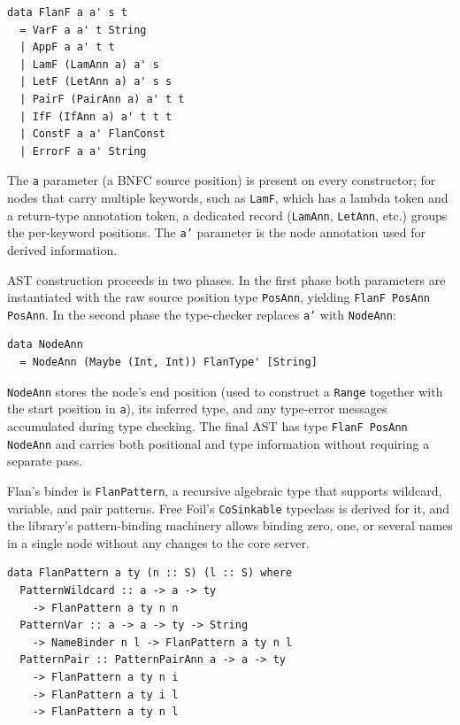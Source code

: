 \begin{verbatim}
data FlanF a a' s t
  = VarF a a' t String
  | AppF a a' t t
  | LamF (LamAnn a) a' s
  | LetF (LetAnn a) a' s s
  | PairF (PairAnn a) a' t t
  | IfF (IfAnn a) a' t t t
  | ConstF a a' FlanConst
  | ErrorF a a' String
\end{verbatim}

The \texttt{a} parameter (a BNFC source position) is present on every constructor; for nodes that carry multiple keywords, such as \texttt{LamF}, which has a lambda token and a return-type annotation token, a dedicated record (\texttt{LamAnn}, \texttt{LetAnn}, etc.) groups the per-keyword positions.
The \texttt{a'} parameter is the node annotation used for derived information.

AST construction proceeds in two phases.
In the first phase both parameters are instantiated with the raw source position type \texttt{PosAnn}, yielding \texttt{FlanF PosAnn PosAnn}.
In the second phase the type-checker replaces \texttt{a'} with \texttt{NodeAnn}:

\begin{verbatim}
data NodeAnn
  = NodeAnn (Maybe (Int, Int)) FlanType' [String]
\end{verbatim}

\texttt{NodeAnn} stores the node's end position (used to construct a \texttt{Range} together with the start position in \texttt{a}), its inferred type, and any type-error messages accumulated during type checking.
The final AST has type \texttt{FlanF PosAnn NodeAnn} and carries both positional and type information without requiring a separate pass.

Flan's binder is \texttt{FlanPattern}, a recursive algebraic type that supports wildcard, variable, and pair patterns.
Free Foil's \texttt{CoSinkable} typeclass is derived for it, and the library's pattern-binding machinery allows binding zero, one, or several names in a single node without any changes to the core server.

\begin{verbatim}
data FlanPattern a ty (n :: S) (l :: S) where
  PatternWildcard :: a -> a -> ty
    -> FlanPattern a ty n n
  PatternVar :: a -> a -> ty -> String
    -> NameBinder n l -> FlanPattern a ty n l
  PatternPair :: PatternPairAnn a -> a -> ty
    -> FlanPattern a ty n i
    -> FlanPattern a ty i l
    -> FlanPattern a ty n l
\end{verbatim}


